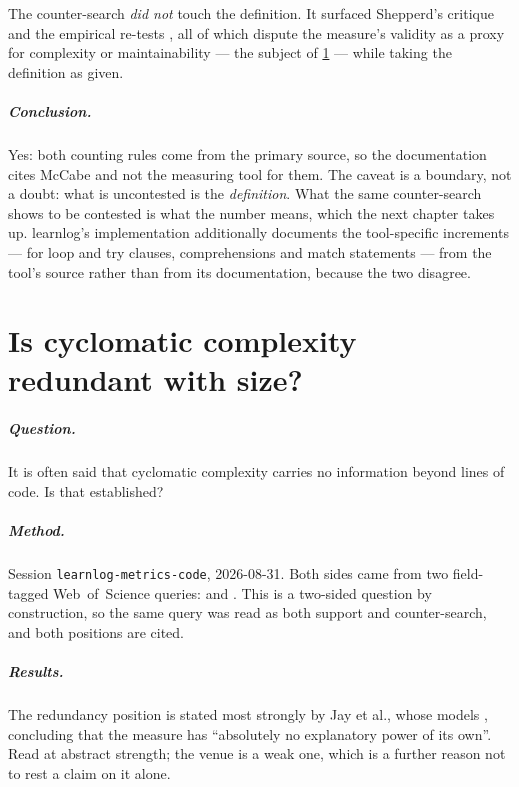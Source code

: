 The counter-search \emph{did not} touch the definition.  It surfaced
Shepperd's critique \autocite{Shepperd1988} and the empirical re-tests
\autocite{Landman2016}, all of which dispute the measure's validity as a
proxy for complexity or maintainability --- the subject of
\cref{app:claim:cc-sloc} --- while taking the definition as given.

\paragraph{Conclusion.}
Yes: both counting rules come from the primary source, so the documentation
cites McCabe and not the measuring tool for them.  The caveat is a boundary,
not a doubt: what is uncontested is the \emph{definition}.  What the same
counter-search shows to be contested is what the number means, which the
next chapter takes up.  learnlog's implementation additionally documents the
tool-specific increments --- for loop and try clauses, comprehensions and
match statements --- from the tool's source rather than from its
documentation, because the two disagree.

\chapter{Is cyclomatic complexity redundant with size?}
\label{app:claim:cc-sloc}

\paragraph{Question.}
It is often said that cyclomatic complexity carries no information beyond
lines of code.  Is that established?

\paragraph{Method.}
Session \texttt{learnlog-metrics-code}, 2026-08-31.  Both sides came from
two field-tagged Web~of~Science queries:  and .  This is
a two-sided question by construction, so the same query was read as both
support and counter-search, and both positions are cited.

\paragraph{Results.}
The redundancy position is stated most strongly by Jay et al., whose models
, concluding that the measure has \enquote{absolutely no
explanatory power of its own}.  Read at abstract strength; the venue is a
weak one, which is a further reason not to rest a claim on it alone.

